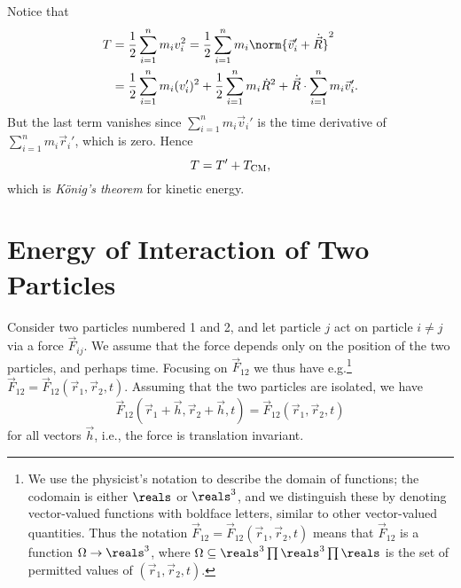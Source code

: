 \documentclass[article, a4paper, 11pt, oneside]{memoir}
\numberwithin{equation}{chapter}
\begin{document}
\begin{remarkbreak}
    Notice that
    \begin{align*}
        T
            &= \frac{1}{2} \sum_{i=1}^n m_i v_i^2
             = \frac{1}{2} \sum_{i=1}^n m_i \norm{\vec{v}_i' + \dot{\vec{R}}}^2 \\
            &= \frac{1}{2} \sum_{i=1}^n m_i (v_i')^2
              + \frac{1}{2} \sum_{i=1}^n m_i \dot{R}^2
              + \dot{\vec{R}} \cdot \sum_{i=1}^n m_i \vec{v}_i'.
    \end{align*}
    But the last term vanishes since $\sum_{i=1}^n m_i \vec{v}_i'$ is the time derivative of $\sum_{i=1}^n m_i \vec{r}_i'$, which is zero. Hence
    \begin{equation*}
        T
            = T' + T_{\mathrm{CM}},
    \end{equation*}
    which is \emph{König's theorem} for kinetic energy.
\end{remarkbreak}


\addtocounter{section}{7}
\section{Energy of Interaction of Two Particles}

Consider two particles numbered 1 and 2, and let particle $j$ act on particle $i \neq j$ via a force $\vec{F}_{ij}$. We assume that the force depends only on the position of the two particles, and perhaps time. Focusing on $\vec{F}_{12}$ we thus have e.g.\footnote{We use the physicist's notation to describe the domain of functions; the codomain is either $\reals$ or $\reals^3$, and we distinguish these by denoting vector-valued functions with boldface letters, similar to other vector-valued quantities. Thus the notation $\vec{F}_{12} = \vec{F}_{12}(\vec{r}_1, \vec{r}_2, t)$ means that $\vec{F}_{12}$ is a function $\Omega \to \reals^3$, where $\Omega \subseteq \reals^3 \prod \reals^3 \prod \reals$ is the set of permitted values of $(\vec{r}_1, \vec{r}_2, t)$.} $\vec{F}_{12} = \vec{F}_{12}(\vec{r}_1, \vec{r}_2, t)$. Assuming that the two particles are isolated, we have
%
\begin{equation*}
    \vec{F}_{12}(\vec{r}_1 + \vec{h}, \vec{r}_2 + \vec{h}, t)
    = \vec{F}_{12}(\vec{r}_1, \vec{r}_2, t)
\end{equation*}
%
for all vectors $\vec{h}$, i.e., the force is translation invariant.
\end{document}
